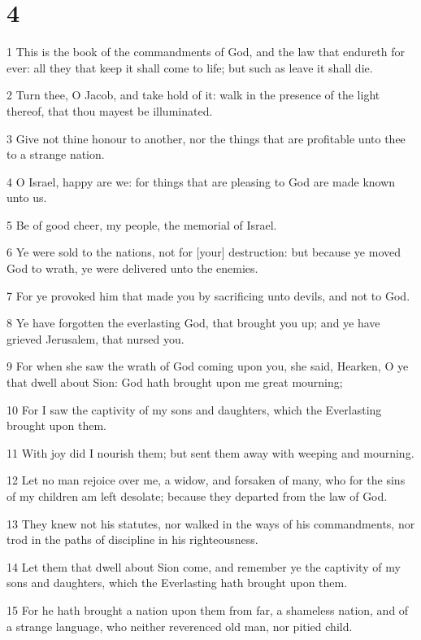 \chapter{4}

\par 1 This is the book of the commandments of God, and the law that endureth for ever: all they that keep it shall come to life; but such as leave it shall die.
\par 2 Turn thee, O Jacob, and take hold of it: walk in the presence of the light thereof, that thou mayest be illuminated.
\par 3 Give not thine honour to another, nor the things that are profitable unto thee to a strange nation.
\par 4 O Israel, happy are we: for things that are pleasing to God are made known unto us.
\par 5 Be of good cheer, my people, the memorial of Israel.
\par 6 Ye were sold to the nations, not for [your] destruction: but because ye moved God to wrath, ye were delivered unto the enemies.
\par 7 For ye provoked him that made you by sacrificing unto devils, and not to God.
\par 8 Ye have forgotten the everlasting God, that brought you up; and ye have grieved Jerusalem, that nursed you.
\par 9 For when she saw the wrath of God coming upon you, she said, Hearken, O ye that dwell about Sion: God hath brought upon me great mourning;
\par 10 For I saw the captivity of my sons and daughters, which the Everlasting brought upon them.
\par 11 With joy did I nourish them; but sent them away with weeping and mourning.
\par 12 Let no man rejoice over me, a widow, and forsaken of many, who for the sins of my children am left desolate; because they departed from the law of God.
\par 13 They knew not his statutes, nor walked in the ways of his commandments, nor trod in the paths of discipline in his righteousness.
\par 14 Let them that dwell about Sion come, and remember ye the captivity of my sons and daughters, which the Everlasting hath brought upon them.
\par 15 For he hath brought a nation upon them from far, a shameless nation, and of a strange language, who neither reverenced old man, nor pitied child.
